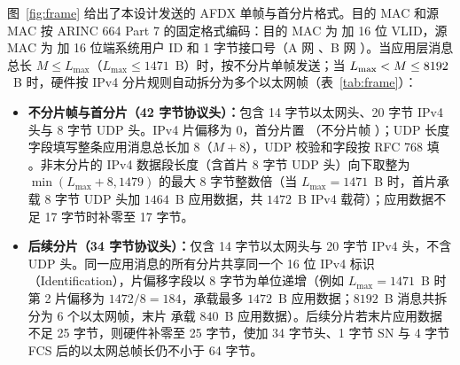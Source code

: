 图~\ref{fig:frame} 给出了本设计发送的 AFDX 单帧与首分片格式。目的 MAC 和源 MAC 按 ARINC 664 Part 7 的固定格式编码：目的 MAC 为  加 16 位 VLID，源 MAC 为  加 16 位端系统用户 ID 和 1 字节接口号（A 网 、B 网 ）。当应用层消息总长 $M \le L_\text{max}$（$L_\text{max}\le 1471$~B）时，按不分片单帧发送；当 $L_\text{max} < M \le 8192$~B 时，硬件按 IPv4 分片规则自动拆分为多个以太网帧（表~\ref{tab:frame}）：
\begin{itemize}[leftmargin=2em,itemsep=1pt]
  \item \textbf{不分片帧与首分片（42 字节协议头）：}包含 14 字节以太网头、20 字节 IPv4 头与 8 字节 UDP 头。IPv4 片偏移为 0，首分片置 （不分片帧 ）；UDP 长度字段填写整条应用消息总长加 8（$M+8$），UDP 校验和字段按 RFC 768 填 。非末分片的 IPv4 数据段长度（含首片 8 字节 UDP 头）向下取整为 $\min(L_\text{max}+8, 1479)$ 的最大 8 字节整数倍（当 $L_\text{max}=1471$~B 时，首片承载 8 字节 UDP 头加 $1464$~B 应用数据，共 $1472$~B IPv4 载荷）；应用数据不足 17 字节时补零至 17 字节。
  \item \textbf{后续分片（34 字节协议头）：}仅含 14 字节以太网头与 20 字节 IPv4 头，不含 UDP 头。同一应用消息的所有分片共享同一个 16 位 IPv4 标识（Identification），片偏移字段以 8 字节为单位递增（例如 $L_\text{max}=1471$~B 时第 2 片偏移为 $1472/8=184$，承载最多 $1472$~B 应用数据；$8192$~B 消息共拆分为 6 个以太网帧，末片  承载 $840$~B 应用数据）。后续分片若末片应用数据不足 25 字节，则硬件补零至 25 字节，使加 34 字节头、1 字节 SN 与 4 字节 FCS 后的以太网总帧长仍不小于 64 字节。
\end{itemize}


